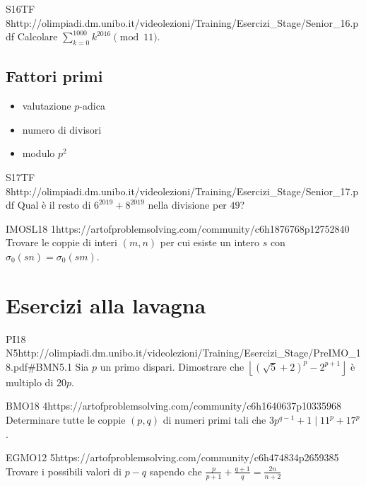 \documentclass[12pt]{article}
\begin{document}
\begin{esercizio}{S16TF 8}{http://olimpiadi.dm.unibo.it/videolezioni/Training/Esercizi_Stage/Senior_16.pdf}
    Calcolare $\sum_{k=0}^{1000} k^{2016}\pmod{11}$.
\end{esercizio}


\subsection{Fattori primi}

\begin{itemize}
    \item valutazione $p$-adica
    \item numero di divisori
    \item modulo $p^2$
\end{itemize}

\begin{esercizio}{S17TF 8}{http://olimpiadi.dm.unibo.it/videolezioni/Training/Esercizi_Stage/Senior_17.pdf}
    Qual è il resto di $6^{2019}+8^{2019}$ nella divisione per $49$?
\end{esercizio}

\begin{esercizio}{IMOSL18 1}{https://artofproblemsolving.com/community/c6h1876768p12752840}
    Trovare le coppie di interi $(m,n)$ per cui esiste un intero $s$ con $\sigma_0(sn)=\sigma_0(sm)$.
\end{esercizio}


\section{Esercizi alla lavagna}

\begin{esercizio}{PI18 N5}{http://olimpiadi.dm.unibo.it/videolezioni/Training/Esercizi_Stage/PreIMO_18.pdf\#BMN5.1}
    Sia $p$ un primo dispari. Dimostrare che $\left\lfloor (\sqrt5+2)^p-2^{p+1} \right\rfloor$ è multiplo di $20p$.
\end{esercizio}

\begin{esercizio}{BMO18 4}{https://artofproblemsolving.com/community/c6h1640637p10335968}
    Determinare tutte le coppie $(p,q)$ di numeri primi tali che $3p^{q-1}+1\mid11^p+17^p$.
\end{esercizio}

\begin{esercizio}{EGMO12 5}{https://artofproblemsolving.com/community/c6h474834p2659385}
    Trovare i possibili valori di $p-q$ sapendo che $\frac{p}{p+1}+\frac{q+1}{q}=\frac{2n}{n+2}$
\end{esercizio}
\end{document}
